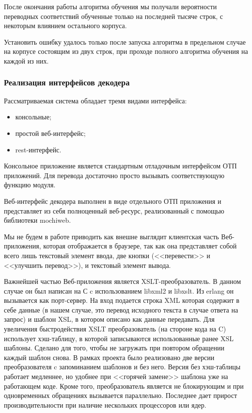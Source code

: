 После окончания работы алгоритма обучения мы получали вероятности 
переводных соответствий обученные только на последней тысяче строк, 
с некоторым влиянием остального корпуса.

Установить ошибку удалось только после запуска алгоритма в предельном случае
на корпусе состоящим из двух строк, при проходе полного алгоритма
обучения на каждой из них.

\pagebreak
\subsubsection{Реализация интерфейсов декодера}

Рассматриваемая система обладает тремя видами интерфейса:
\begin{itemize}
	\item консольные;
	\item простой веб-интерфейс;
	\item rest-интерфейс.
\end{itemize}

Консольное приложение является стандартным отладочным интерфейсом ОТП приложений.
Для перевода достаточно просто  вызывать соответствующую функцию модуля.

Веб-интерфейс декодера выполнен в виде отдельного ОТП приложения и представляет
из себя полноценный веб-ресурс, реализованный с помощью библиотеки mochiweb.

Мы не будем в работе приводить как внешне выглядит клиентская часть Веб-приложения,
которая отображается в браузере, так как она представляет собой всего лишь текстовый элемент ввода,
две кнопки (<<перевести>> и <<улучшить перевод>>), и текстовый элемент вывода.

Важнейшей частью Веб-приложения является XSLT-преобразователь.
В данном случае он был написан на С c использованием libxml2 и libxslt.
Из erlang он вызывается как порт-сервер. На вход подается строка XML 
которая содержит в себе данные (в нашем случае, это перевод исходного текста в случае ответа на запрос)
и шаблон XSL, в котором описано как данные передавать.
Для увеличения быстродействия XSLT преобразователь (на стороне кода на C) 
использует хэш-таблицу, в которой записываются использованные ранее XSL шаблоны. 
Сделано для того, чтобы не загружать при повтором обращении каждый шаблон снова.
В рамках проекта было реализовано две версии преобразователя c запоминанием шаблонов и без него.
Версия без хэш-таблицы работает медленнее, но удобнее при <<горячей замене>> шаблона 
уже на работающем коде.
Кроме того, преобразователь является не блокирующим и при одновременных обращениях
вызывается параллельно. Последнее дает прирост производительности 
при наличие нескольких процессоров или ядер.

